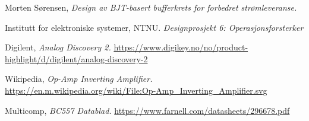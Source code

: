 
    Morten Sørensen,
    \emph{Design av BJT-basert bufferkrets for forbedret strømleveranse.}

    Institutt for elektroniske systemer, NTNU.
    \emph{Designprosjekt 6: Operasjonsforsterker}

    Digilent,
    \emph{Analog Discovery 2.}
    \url{https://www.digikey.no/no/product-highlight/d/digilent/analog-discovery-2}

    Wikipedia,
    \emph{Op-Amp Inverting Amplifier.}
    \url{https://en.m.wikipedia.org/wiki/File:Op-Amp_Inverting_Amplifier.svg}

    Multicomp,
    \emph{BC557 Datablad.}
    \url{https://www.farnell.com/datasheets/296678.pdf}
